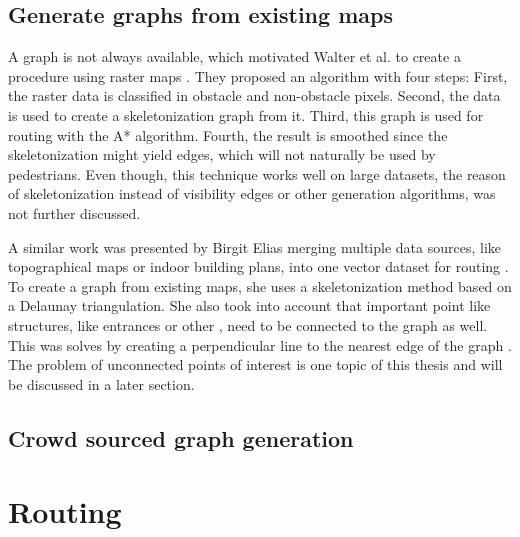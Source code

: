 	\subsection{Generate graphs from existing maps}
	
		A graph is not always available, which motivated Walter et al. to create a procedure using raster maps \cite{walter-raster-maps}.
		They proposed an algorithm with four steps:
		First, the raster data is classified in obstacle and non-obstacle pixels.
		Second, the data is used to create a skeletonization graph from it.
		Third, this graph is used for routing with the A* algorithm.
		Fourth, the result is smoothed since the skeletonization might yield edges, which will not naturally be used by pedestrians.
		Even though, this technique works well on large datasets, the reason of skeletonization instead of visibility edges or other generation algorithms, was not further discussed.
		
		A similar work was presented by Birgit Elias merging multiple data sources, like topographical maps or indoor building plans, into one vector dataset for routing \cite{elias-tailored-geodatabase}.
		To create a graph from existing maps, she uses a skeletonization method based on a Delaunay triangulation.
		She also took into account that important point like structures, like entrances or other , need to be connected to the graph as well.
		This was solves by creating a perpendicular line to the nearest edge of the graph \cite[5]{elias-tailored-geodatabase}.
		The problem of unconnected points of interest is one topic of this thesis and will be discussed  in a later section.
		
	\subsection{Crowd sourced graph generation}
	
	
	
\section{Routing}

